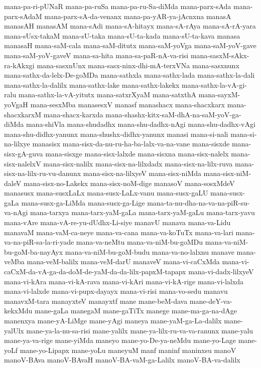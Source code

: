 {mana-pa-ri-pUNaR
mana-pa-ruSa
mana-pa-ru-Sa-diMda
mana-parx-sAda
mana-parx-sAdaM
mana-parx-sA-da-venanx
mana-pa-yAR-ya-jAcnxna
manasA
manasAH
manasAM
mana-sAdi
mana-sA-hitayx
mana-sA-rAya
mana-sA-rA-yara
mana-sUsx-takaM
mana-sU-taka
mana-sU-ta-kada
mana-sU-ta-kava
manasa
manasaH
mana-saM-cala
mana-saM-ditutx
mana-saM-yoVga
mana-saM-yoV-gave
mana-saM-yoV-gaveV
mana-sa-hita
mana-sa-paR-nA-va-risi
mana-sasxM-sAkx-ra-kAkxgi
mana-sasxnUnx
mana-sasx-ninx-dhi-mA-terxVNa
mana-sasxnunx
mana-sathx-da-lelx-De-goMDa
mana-sathxla
mana-sathx-lada
mana-sathx-la-dali
mana-sathx-la-dalilx
mana-sathx-lake
mana-sathx-lakekx
mana-sathx-la-vA-gi-ralu
mana-sathx-la-vA-yitutx
mana-satxrXyaM
mana-satxthA
mana-sayxM-yoVgaH
mana-sesxMba
manasesxV
manasf
manashacx
mana-shacxkarx
mana-shacxkarxM
mana-shacx-karxda
mana-shashx-kitx-saM-dhA-na-saM-yoV-ga-diMda
mana-shiVla
mana-shudadhx
mana-shu-dadhx-nAgi
mana-shu-dadhx-vAgi
mana-shu-didhx-yanunx
mana-shushx-didhx-yanunx
manasi
mana-si-nali
mana-si-na-lilxye
manasisx
mana-sisx-da-nu-ru-ha-ba-lalx-va-na-vane
mana-sisxde
mana-sisx-gA-guva
mana-sisxge
mana-sisx-lalxde
mana-sisxna
mana-sisx-nalelx
mana-sisx-nalelxV
mana-sisx-nalilx
mana-sisx-na-lilxdadx
mana-sisx-na-lilx-ruva
mana-sisx-na-lilx-ru-vu-danunx
mana-sisx-na-lilxyeV
mana-sisx-niMda
mana-sisx-niM-daleV
mana-sisx-no-Lakekx
mana-sisx-noM-dige
manasoV
mana-sosxMdeV
manasusx
mana-susxLaLx
mana-susx-LaLx-vanu
mana-susx-gaLU
mana-susx-gaLa
mana-susx-ga-LiMda
mana-susx-ga-Lige
mana-ta-nu-dha-na-va-na-piR-su-va-nAgi
mana-tarxya
mana-tarx-yaM-gaLa
mana-tarx-yaM-gaLu
mana-tarx-yavu
mana-vAre
mana-vA-re-yu-dUdhx-Li-siye
manavU
manava
mana-va-Lidu
manavaM
mana-vaM-ca-neye
mana-va-cana
mana-va-koTuTx
mana-va-lari
mana-va-na-piR-sa-la-ri-yade
mana-va-neMtu
mana-va-niM-bu-goMDu
mana-va-niM-bu-goM-ba-nayAyx
mana-va-niM-bu-goM-budu
mana-va-no-lalxnu
manave
mana-veMba
mana-veM-balilx
mana-veM-darU
manaveV
mana-vi-caCxMda
mana-vi-caCxM-da-vA-ga-da-doM-de-yaM-da-da-lilx-papxM-tapapx
mana-vi-dadx-lilxyeV
mana-vi-kAra
mana-vi-kA-rava
mana-vi-kAri
mana-vi-kA-rige
mana-vi-lalxda
mana-vi-lalxde
mana-vi-pupx-dayayx
mana-vi-risi
mana-vo-sedu
manavu
manavxM-tara
manayxteV
manayxtf
mane
mane-beM-dava
mane-deY-va-kekxMdu
mane-gaLa
manegaM
mane-gaTiTx
manege
mane-ma-ga-na-dAge
manenxya
mane-yA-LiMge
mane-yAgi
maneya
mane-yaM-ga-La-dalilx
mane-yalUlx
mane-ya-la-nu-sa-risi
mane-yalilx
mane-ya-lilx-ru-va-va-ranunx
mane-yalu
mane-ya-va-rige
mane-yiMda
maneyo
mane-yo-De-ya-neMdu
mane-yo-Lage
mane-yoLf
mane-yo-Lipapx
mane-yoLu
maneyuM
manf
maninf
maninxsu
manoV
manoV-BAva
manoV-BAvaH
manoV-BA-vaM-ga-Lalilx
manoV-BA-va-dalilx
}
